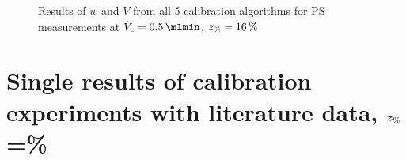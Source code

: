 \begin{figure}[!hb]
\begin{center}
\begin{subfigure}{\subFigSize}
    \end{subfigure}
  \end{center}
  \vspace*{-4ex}    
  \caption[Results of $w$ and $V$ from all 5 calibration algorithms for PS measurements at
  $\Vc = \SI{0.5}{\mlmin}$, $\zP = \SI{16}{\percent}$]{
    Results of $w$ and $V$ from all 5 calibration algorithms for PS measurements at
    $\Vc = \SI{0.5}{\mlmin}$, $\zP = \SI{16}{\percent}$
  }
  \label{fig:calibRes_PS_VC0_5_16}
\end{figure}
\FloatBarrier
\clearpage
\section*{Single results of calibration experiments with literature data, 
  $\bm{z_\text{\%}}$\thinspace=\thinspace\%}
\setcounter{subfigure}{0}
